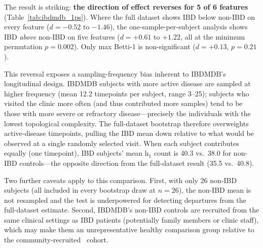 The result is striking: \textbf{the direction of effect reverses for 5 of 6
features} (Table~\ref{tab:ibdmdb_1ps}).
Where the full dataset shows IBD below non-IBD on every feature ($d = -0.52$
to $-1.46$), the one-sample-per-subject analysis shows IBD \emph{above}
non-IBD on five features ($d = +0.61$ to $+1.22$, all at the minimum
permutation $p = 0.002$).
Only max Betti-1 is non-significant ($d = +0.13$, $p = 0.21$).

This reversal exposes a sampling-frequency bias inherent to IBDMDB's
longitudinal design.
IBDMDB subjects with more active disease are sampled at higher frequency
(mean 12.2 timepoints per subject, range 3--25); subjects who visited the
clinic more often (and thus contributed more samples) tend to be those with
more severe or refractory disease---precisely the individuals with the lowest
topological complexity.
The full-dataset bootstrap therefore overweights active-disease timepoints,
pulling the IBD mean down relative to what would be observed at a single
randomly selected visit.
When each subject contributes equally (one timepoint), IBD subjects' mean
h$_1$ count is 40.3 vs.\ 38.0 for non-IBD controls---the opposite direction
from the full-dataset result (35.5 vs.\ 40.8).

Two further caveats apply to this comparison.
First, with only 26 non-IBD subjects (all included in every bootstrap
draw at $n = 26$), the non-IBD mean is not resampled and the test is
underpowered for detecting departures from the full-dataset estimate.
Second, IBDMDB's non-IBD controls are recruited from the same clinical
settings as IBD patients (potentially family members or clinic staff),
which may make them an unrepresentative healthy comparison group relative to
the community-recruited \agp\ cohort.

